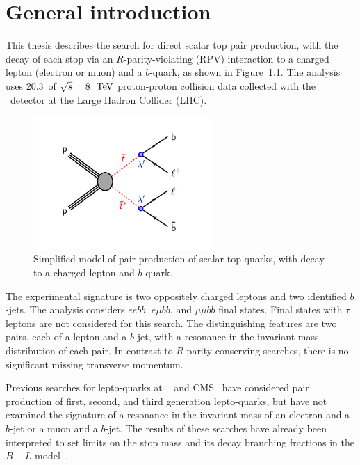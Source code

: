 \chapter[General introduction][General introduction]{General introduction}
\label{ch:intro}

This thesis describes the search for direct scalar top pair production, with
the decay of each stop via an $R$-parity-violating (RPV) interaction to a
charged lepton (electron or muon) and a $b$-quark, as shown in
Figure~\ref{fig:blstop_diagram}.
The analysis uses 20.3~\ifb of $\sqrt{s}=8~\TeV$ proton-proton collision data
collected with the \atlas\ detector at the Large Hadron Collider (LHC).

\begin{figure}[ht]
  \centering
  \includegraphics[width=0.60\textwidth]{figs/blstop/b_minus_l_stop_stop.pdf}
  \caption{Simplified model of pair production of scalar top quarks, with
    decay to a charged lepton and $b$-quark.
  }
  \label{fig:blstop_diagram}
\end{figure}


The experimental signature is two oppositely charged leptons and two identified
$b$-jets.
The analysis considers $eebb$, $e \mu bb$, and $\mu \mu bb$ final states.
Final states with $\tau$ leptons are not considered for this search.
The distinguishing features are two pairs, each of a lepton and a $b$-jet, with
a resonance in the invariant mass distribution of each pair.
In contrast to $R$-parity conserving searches, there is no significant missing
transverse momentum.

Previous searches for lepto-quarks at \atlas~\cite{ATLAS:2013oea,
ATLAS:2012aq, Aad:2011ch, Aad:2011uv} and
CMS~\cite{Khachatryan:2014ura, CMS:2014qpa, Chatrchyan:2012sv,
Chatrchyan:2012vza} have considered pair production of first, second,
and third generation lepto-quarks, but have not examined the signature
of a resonance in the invariant mass of an electron and a $b$-jet or a
muon and a $b$-jet.  The results of these searches have already been
interpreted to set limits on the stop mass and its decay
branching fractions in the $B-L$
model~\cite{Marshall:2014cwa, Marshall:2014kea}.

